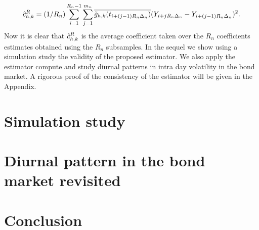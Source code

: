 \begin{align}
  \hat{c}_{h,k}^R = (1/R_n) \sum_{i=1}^{R_n -1} \sum_{j =1}^{m_n} \overline{\tilde{g}_{h,k}(t_{i+ (j-1)R_n\Delta_n})}(Y_{i+ jR_n\Delta_n}-Y_{i+ (j-1)R_n\Delta_n})^2. \notag 
  \label{}
\end{align}
Now it is clear that $\hat{c}_{h,k}^R$ is the average coefficient taken over the $R_n$  coefficients estimates obtained using the $R_n$ subsamples. In the sequel we show using a simulation study the validity of the proposed estimator. We also apply the estimator compute and study diurnal patterns in intra day volatility in the bond market.  A rigorous proof of the consistency of the estimator will be given in the Appendix.
\section{Simulation study} \label{sec:simulation2}
\section{Diurnal pattern in the bond market revisited}\label{sec:empirics2}
\section{Conclusion}\label{sec:conclusion2}
